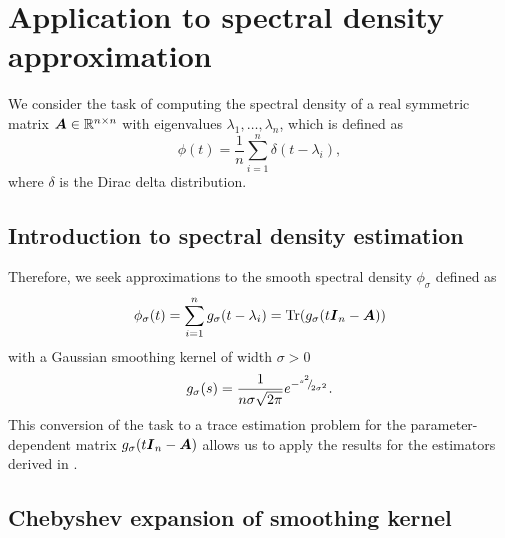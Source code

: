 \documentclass[12pt]{article}
\begin{document}
\section{Application to spectral density approximation}
\label{sec:application}

We consider the task of computing the spectral density of a real symmetric matrix $\boldsymbol{A} \in \mathbb{R}^{n \times n}$ with eigenvalues $\lambda_1, \dots, \lambda_n$, which is defined as
\begin{equation}
    \phi(t) = \frac{1}{n} \sum_{i=1}^{n} \delta(t - \lambda_i),
    \label{equ:spectral-density}
\end{equation}
where $\delta$ is the Dirac delta distribution.

\subsection{Introduction to spectral density estimation}
\label{subsec:spectral-density}

 Therefore, we seek approximations to the smooth spectral density $\phi_{\sigma}$ defined as
\begin{equation}
    \phi_{\sigma}(t) = \sum_{i=1}^{n} g_{\sigma}(t - \lambda_i) = \operatorname{Tr}(g_{\sigma}(t\boldsymbol{I}_n - \boldsymbol{A}))
    \label{equ:smooth-spectral-density}
\end{equation}
with a Gaussian smoothing kernel of width $\sigma > 0$
\begin{equation}
    g_{\sigma}(s) = \frac{1}{n \sigma \sqrt{2\pi}} e^{-{}^{s^2}{\mskip -5mu/\mskip -3mu}_{2\sigma^2}}.
    \label{equ:smoothing-kernel}
\end{equation}
This conversion of the task to a trace estimation problem for the parameter-dependent matrix $g_{\sigma}(t\boldsymbol{I}_n - \boldsymbol{A})$ allows us to apply the results for the estimators derived in .


\subsection{Chebyshev expansion of smoothing kernel}
\label{subsec:chebyshev-expansion}
\end{document}
